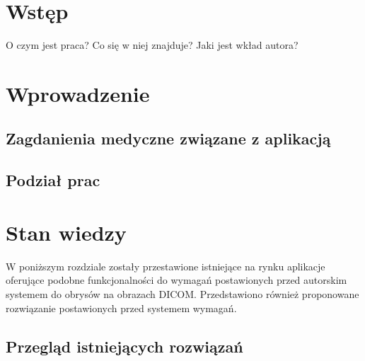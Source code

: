 \documentclass[a4paper,11pt,twoside]{report}
\theoremstyle{definition}
\begin{document}
\thispagestyle{empty}
\newpage

\null\thispagestyle{empty}\newpage


\tableofcontents
\thispagestyle{empty}


\null\thispagestyle{empty}\newpage
\pagestyle{fancy}
\setcounter{page}{11} %

\chapter*{Wstęp}

O czym jest praca? Co się w niej znajduje? Jaki jest wkład autora?

\chapter {Wprowadzenie}

\section {Zagdanienia medyczne związane z aplikacją}

\section {Podział prac}


\chapter {Stan wiedzy}

W poniższym rozdziale zostały przestawione istniejące na rynku aplikacje oferujące podobne funkcjonalności do wymagań postawionych przed autorskim systemem do obrysów na obrazach DICOM. Przedstawiono również proponowane rozwiązanie postawionych przed systemem wymagań.

\section {Przegląd istniejących rozwiązań}
\end{document}
